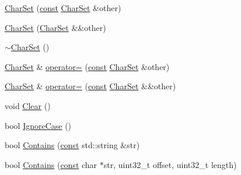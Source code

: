 \begin{DoxyCompactItemize}
\item 
\mbox{\hyperlink{classlucene_1_1core_1_1analysis_1_1characterutil_1_1CharSet_ac2220cc2163fb0d99e8b208ef18d2347}{Char\+Set}} (\mbox{\hyperlink{ZlibCrc32_8h_a2c212835823e3c54a8ab6d95c652660e}{const}} \mbox{\hyperlink{classlucene_1_1core_1_1analysis_1_1characterutil_1_1CharSet}{Char\+Set}} \&other)
\item 
\mbox{\hyperlink{classlucene_1_1core_1_1analysis_1_1characterutil_1_1CharSet_a263fdea9d1abee5f4f2af6afcf4f6771}{Char\+Set}} (\mbox{\hyperlink{classlucene_1_1core_1_1analysis_1_1characterutil_1_1CharSet}{Char\+Set}} \&\&other)
\item 
\mbox{\hyperlink{classlucene_1_1core_1_1analysis_1_1characterutil_1_1CharSet_ade8980396209cc39e08d6235afec7cb4}{$\sim$\+Char\+Set}} ()
\item 
\mbox{\hyperlink{classlucene_1_1core_1_1analysis_1_1characterutil_1_1CharSet}{Char\+Set}} \& \mbox{\hyperlink{classlucene_1_1core_1_1analysis_1_1characterutil_1_1CharSet_af733c1ca8ab800f6734222d15b696d90}{operator=}} (\mbox{\hyperlink{ZlibCrc32_8h_a2c212835823e3c54a8ab6d95c652660e}{const}} \mbox{\hyperlink{classlucene_1_1core_1_1analysis_1_1characterutil_1_1CharSet}{Char\+Set}} \&other)
\item 
\mbox{\hyperlink{classlucene_1_1core_1_1analysis_1_1characterutil_1_1CharSet}{Char\+Set}} \& \mbox{\hyperlink{classlucene_1_1core_1_1analysis_1_1characterutil_1_1CharSet_a75d7014ce0e683dcce2afe2f2b0ac76f}{operator=}} (\mbox{\hyperlink{ZlibCrc32_8h_a2c212835823e3c54a8ab6d95c652660e}{const}} \mbox{\hyperlink{classlucene_1_1core_1_1analysis_1_1characterutil_1_1CharSet}{Char\+Set}} \&\&other)
\item 
void \mbox{\hyperlink{classlucene_1_1core_1_1analysis_1_1characterutil_1_1CharSet_a7c1ba73acd1bd01e13050bee427ec660}{Clear}} ()
\item 
bool \mbox{\hyperlink{classlucene_1_1core_1_1analysis_1_1characterutil_1_1CharSet_ac79e72d9f869029e339c37d118a65772}{Ignore\+Case}} ()
\item 
bool \mbox{\hyperlink{classlucene_1_1core_1_1analysis_1_1characterutil_1_1CharSet_a6ffa312595246916fd97a235271bf9ce}{Contains}} (\mbox{\hyperlink{ZlibCrc32_8h_a2c212835823e3c54a8ab6d95c652660e}{const}} std\+::string \&str)
\item 
bool \mbox{\hyperlink{classlucene_1_1core_1_1analysis_1_1characterutil_1_1CharSet_a4b5e988cfe249cbb1cca7d82192413bd}{Contains}} (\mbox{\hyperlink{ZlibCrc32_8h_a2c212835823e3c54a8ab6d95c652660e}{const}} char $\ast$str, uint32\+\_\+t offset, uint32\+\_\+t length)

\end{DoxyCompactItemize}
